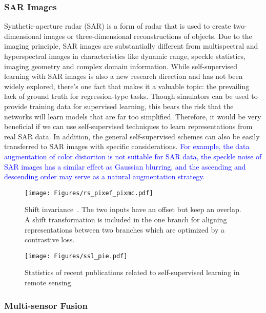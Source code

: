 \documentclass[lettersize,journal]{IEEEtran}
\begin{document}
\subsubsection{SAR Images}
Synthetic-aperture radar (SAR) is a form of radar that is used to create two-dimensional images or three-dimensional reconstructions of objects. Due to the imaging principle, SAR images are substantially different from multispectral and hyperspectral images in characteristics like dynamic range, speckle statistics, imaging geometry and complex domain information. While self-supervised learning with SAR images is also a new research direction and has not been widely explored, there's one fact that makes it a valuable topic: the prevailing lack of ground truth for regression-type tasks. Though simulators can be used to provide training data for supervised learning, this bears the risk that the networks will learn models that are far too simplified. Therefore, it would be very beneficial if we can use self-supervised techniques to learn representations from real SAR data. In addition, the general self-supervised schemes can also be easily transferred to SAR images with specific considerations. \textcolor{blue}{For example, the data augmentation of color distortion is not suitable for SAR data, the speckle noise of SAR images has a similar effect as Gaussian blurring, and the ascending and descending order may serve as a natural augmentation strategy.}




\begin{figure}
\centering
\texttt{[image: Figures/rs\_pixef\_pixmc.pdf]}
\caption[PixEF]{Shift invariance~\cite{chen2021self0}. The two inputs have an offset but keep an overlap. A shift transformation is included in the one branch
for aligning representations between two branches which are optimized by a contrastive loss.}
\label{fig:pixef}
\end{figure}

\begin{figure}
\centering
\texttt{[image: Figures/ssl\_pie.pdf]}
\caption[publications ssl in rs]{Statistics of recent publications related to self-supervised learning in remote sensing.}
\label{fig:ssl-publications}
\end{figure}

\subsubsection{Multi-sensor Fusion}
\end{document}
